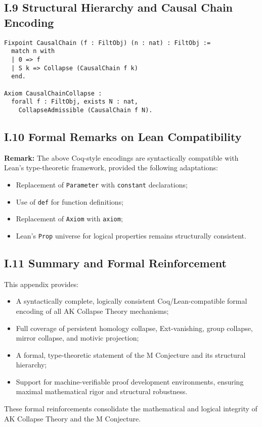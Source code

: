 \documentclass[11pt]{article}
\begin{document}
\subsection*{I.9 Structural Hierarchy and Causal Chain Encoding}

\begin{lstlisting}[language=Coq, caption=Causal Chain and Hierarchy]
Fixpoint CausalChain (f : FiltObj) (n : nat) : FiltObj :=
  match n with
  | 0 => f
  | S k => Collapse (CausalChain f k)
  end.

Axiom CausalChainCollapse :
  forall f : FiltObj, exists N : nat,
    CollapseAdmissible (CausalChain f N).
\end{lstlisting}

\subsection*{I.10 Formal Remarks on Lean Compatibility}

\textbf{Remark:} The above Coq-style encodings are syntactically compatible with Lean's type-theoretic framework, provided the following adaptations:

\begin{itemize}
    \item Replacement of \texttt{Parameter} with \texttt{constant} declarations;
    \item Use of \texttt{def} for function definitions;
    \item Replacement of \texttt{Axiom} with \texttt{axiom};
    \item Lean's \texttt{Prop} universe for logical properties remains structurally consistent.
\end{itemize}

\subsection*{I.11 Summary and Formal Reinforcement}

This appendix provides:

\begin{itemize}
    \item A syntactically complete, logically consistent Coq/Lean-compatible formal encoding of all AK Collapse Theory mechanisms;
    \item Full coverage of persistent homology collapse, Ext-vanishing, group collapse, mirror collapse, and motivic projection;
    \item A formal, type-theoretic statement of the M Conjecture and its structural hierarchy;
    \item Support for machine-verifiable proof development environments, ensuring maximal mathematical rigor and structural robustness.
\end{itemize}

These formal reinforcements consolidate the mathematical and logical integrity of AK Collapse Theory and the M Conjecture.

\FloatBarrier
\end{document}
